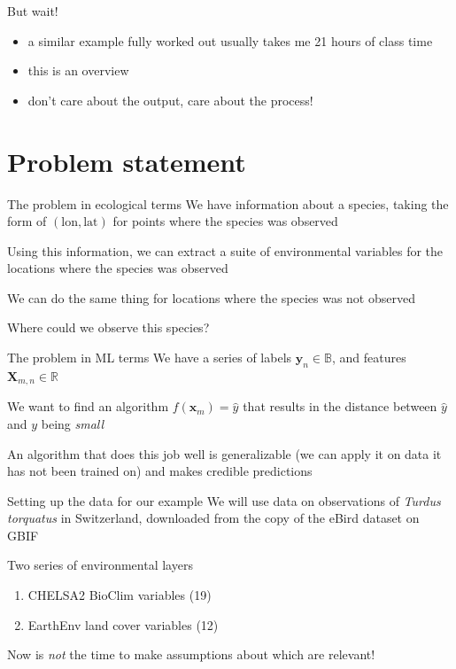 \documentclass[12pt, smalloffset, compress, aspectratio=1610]{beamer}
\providecommand{\tightlist}{%
  \setlength{\itemsep}{0pt}\setlength{\parskip}{0pt}}
\begin{document}
\begin{frame}{But wait!}
\label{but-wait}
\begin{itemize}
\tightlist
\item
  a similar example fully worked out usually takes me 21 hours of class
  time
\item
  this is an overview
\item
  don't care about the output, care about the \alert{process}!
\end{itemize}
\end{frame}

\section{Problem statement}\label{problem-statement}

\begin{frame}{The problem in ecological terms}
\label{the-problem-in-ecological-terms}
We have information about a species, taking the form of
\((\text{lon}, \text{lat})\) for points where the species was observed

Using this information, we can extract a suite of environmental
variables for the locations where the species was observed

We can do the same thing for locations where the species was not
observed

\alert{Where could we observe this species}?
\end{frame}

\begin{frame}{The problem in ML terms}
\label{the-problem-in-ml-terms}
We have a series of labels \(\mathbf{y}_n \in \mathbb{B}\), and features
\(\mathbf{X}_{m,n} \in \mathbb{R}\)

We want to find an algorithm \(f(\mathbf{x}_m) = \hat y\) that results
in the distance between \(\hat y\) and \(y\) being \emph{small}

An algorithm that does this job well is generalizable (we can apply it
on data it has not been trained on) and makes credible predictions
\end{frame}

\begin{frame}{Setting up the data for our example}
\label{setting-up-the-data-for-our-example}
We will use data on observations of \emph{Turdus torquatus} in
Switzerland, downloaded from the copy of the eBird dataset on GBIF

Two series of environmental layers

\begin{enumerate}
\tightlist
\item
  CHELSA2 BioClim variables (19)
\item
  EarthEnv land cover variables (12)
\end{enumerate}

Now is \emph{not} the time to make assumptions about which are relevant!
\end{frame}
\end{document}
